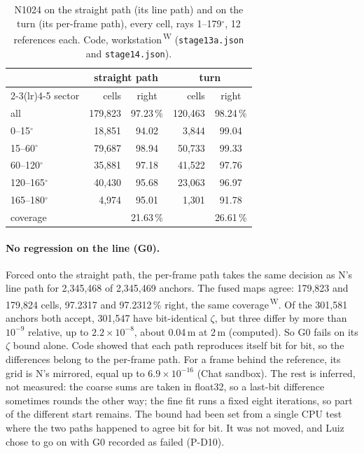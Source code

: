 \documentclass[11pt,a4paper]{article}
\newcommand{\code}[1]{\texttt{\small #1}}
\newcommand{\src}[1]{\textsuperscript{\,#1}}
\newcommand{\WS}{\src{W}}   %
\begin{document}
\begin{table}[h]
\centering\small
\begin{tabular}{@{}lrcrc@{}}
\toprule
 & \multicolumn{2}{c}{straight path} & \multicolumn{2}{c}{turn}\\
\cmidrule(lr){2-3}\cmidrule(lr){4-5}
sector & cells & right & cells & right\\
\midrule
all & 179,823 & 97.23\,\% & 120,463 & 98.24\,\%\\
0--15$^\circ$ & 18,851 & 94.02 & 3,844 & 99.04\\
15--60$^\circ$ & 79,687 & 98.94 & 50,733 & 99.33\\
60--120$^\circ$ & 35,881 & 97.18 & 41,522 & 97.76\\
120--165$^\circ$ & 40,430 & 95.68 & 23,063 & 96.97\\
165--180$^\circ$ & 4,974 & 95.01 & 1,301 & 91.78\\
\midrule
coverage & & 21.63\,\% & & 26.61\,\%\\
\bottomrule
\end{tabular}
\caption{N1024 on the straight path (its line path) and on the turn (its per-frame path), every cell, rays
1--179$^\circ$, 12 references each. Code, workstation\WS{} (\code{stage13a.json} and \code{stage14.json}).}\label{tab:turn}
\end{table}

\paragraph{No regression on the line (G0).} Forced onto the straight path, the per-frame path takes the same decision as
N's line path for 2,345,468 of 2,345,469 anchors. The fused maps agree: 179,823 and 179,824 cells, 97.2317 and
97.2312\,\% right, the same coverage\WS. Of the 301,581 anchors both accept, 301,547 have bit-identical $\zeta$, but three
differ by more than $10^{-9}$ relative, up to $2.2\times10^{-8}$, about 0.04\,\textmu m at 2\,m (computed). So G0 fails on its $\zeta$
bound alone. Code showed that each path reproduces itself bit for bit, so the differences belong to the per-frame path.
For a frame behind the reference, its grid is N's mirrored, equal up to $6.9\times10^{-16}$ (Chat sandbox). The rest is
inferred, not measured: the coarse sums are taken in float32, so a last-bit difference sometimes rounds the other way;
the fine fit runs a fixed eight iterations, so part of the different start remains. The bound had been set from a single
CPU test where the two paths happened to agree bit for bit. It was not moved, and Luiz chose to go on with G0 recorded as
failed (P-D10).
\end{document}
